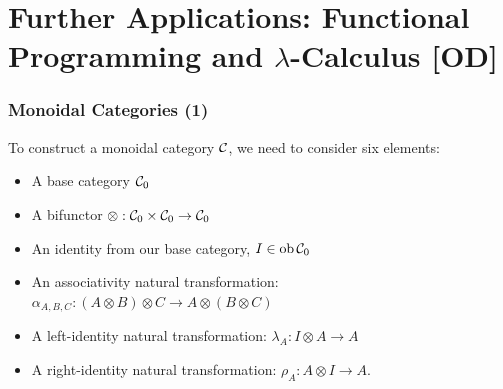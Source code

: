 \documentclass{beamer}
\numberwithin{figure}{section}
\begin{document}
\section[Further Applications: Functional Programming {[OD]}]%
        {Further Applications: Functional Programming and
        \texorpdfstring{$\lambda$}{Lambda}-Calculus [OD]}
\begin{frame}
        \frametitle{Monoidal Categories (1)}
        To construct a monoidal category $\mathcal{C}$, we need to consider six
        elements:
        \begin{itemize}
                \item A base category $\mathcal{C}_0$
                \item A bifunctor $\otimes:\mathcal{C}_0 \times \mathcal{C}_0
                        \to \mathcal{C}_0$
                \item An identity from our base category, $I \in \operatorname{ob}
                \mathcal{C}_0$
                \item An associativity natural transformation:
                        $\alpha_{A,B,C} : (A \otimes B) \otimes C \to A \otimes
                        (B \otimes C)$
                \item A left-identity natural transformation:
                        $\lambda_A: I \otimes A \to A$
                \item A right-identity natural transformation:
                        $\rho_A: A \otimes I \to A$.
        \end{itemize}
\end{frame}
\end{document}
